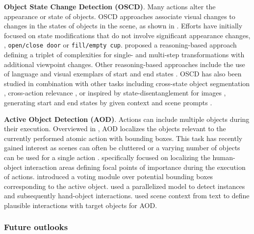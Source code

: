 \noindent
\textbf{Object State Change Detection (OSCD)}. Many actions alter the appearance or state of objects. OSCD approaches associate visual changes to changes in the states of objects in the scene, as shown in . Efforts  have initially focused on state modifications that do not involve significant appearance changes, \eg, \texttt{open/close door} or \texttt{fill/empty cup}.  proposed a reasoning-based approach defining a triplet of complexities for single- and multi-step transformations with additional viewpoint changes. Other reasoning-based approaches include the use of language  and visual exemplars of start and end states . OSCD has also been studied in combination with other tasks including cross-state object segmentation , cross-action relevance , or inspired by state-disentanglement for images , generating start and end states by given context and scene prompts .

\noindent
\textbf{Active Object Detection (AOD)}. Actions can include multiple objects during their execution. Overviewed in , AOD localizes the objects relevant to the currently performed atomic action with bounding boxes. This task has recently gained interest as scenes can often be cluttered  or a varying number of objects can be used for a single action .  specifically focused on localizing the human-object interaction areas defining focal points of importance during the execution of actions.  introduced a voting module over potential bounding boxes corresponding to the active object.  used a parallelized model to detect instances and subsequently hand-object interactions.  used scene context from text to define plausible interactions with target objects for AOD.  


\subsubsection{Future outlooks}
\label{sec:prediction::states:::outlooks}


